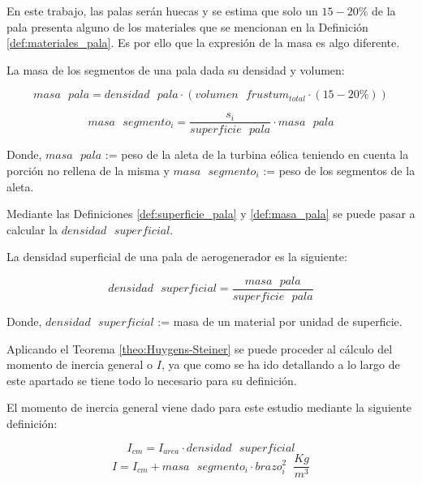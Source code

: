 En este trabajo, las palas serán huecas y se estima que solo un $15-20\%$ de la pala presenta alguno de los materiales que se mencionan en la Definición \ref{def:materiales_pala}. Es por ello que la expresión de la masa es algo diferente. \\

 \begin{definicion}
La masa de los segmentos de una pala dada su densidad y volumen:

$$ masa \text{ } pala = densidad \text{ } pala \cdot (volumen \text{ } frustum_{total} \cdot (15-20\%) ) $$

$$ masa \text{ } segmento_i = \dfrac{s_i}{superficie \text{ } pala} \cdot masa \text{ } pala $$

 Donde, $ masa \text{ } pala $ := peso de la aleta de la turbina eólica teniendo en cuenta la porción no rellena de la misma y $ masa \text{ } segmento_i $ := peso de los segmentos de la aleta.\\
 \label{def:masa_pala}
 \end{definicion}
 
 Mediante las Definiciones \ref{def:superficie_pala} y \ref{def:masa_pala} se puede pasar a calcular la $densidad \text{ } superficial$.\\
 
  \begin{definicion}
La densidad superficial de una pala de aerogenerador es la siguiente:

$$ densidad \text{ } superficial = \dfrac{masa \text{ } pala}{ superficie \text{ } pala}$$

 Donde, $ densidad \text{ } superficial $ := masa de un material por unidad de superficie. \\
 \label{def:densidad_superficial}
 \end{definicion}
 
 
Aplicando el Teorema \ref{theo:Huygens-Steiner} se puede proceder al cálculo del momento de inercia general o $I$, ya que como se ha ido detallando a lo largo de este apartado se tiene todo lo necesario para su definición.\\

  \begin{definicion}
El momento de inercia general viene dado para este estudio mediante la siguiente definición:

$$I_{cm} = I_{area} \cdot densidad \text{ } superficial $$
$$I = I_{cm} + masa \text{ } segmento_i \cdot brazo_i^2 \hspace{7pt} \dfrac{Kg}{m^3}$$

 \label{def:momento_inercia_general}
 \end{definicion}
 
